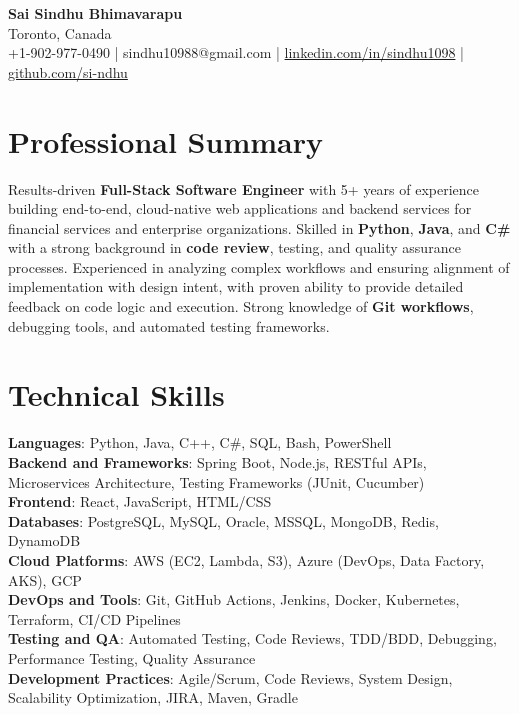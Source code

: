 \documentclass[letterpaper,11pt]{article}
\begin{document}
\begin{center}
  {\Large \textbf{Sai Sindhu Bhimavarapu}} \\
  Toronto, Canada \\
  +1-902-977-0490 \enspace | \enspace sindhu10988@gmail.com \enspace | \enspace \href{https://www.linkedin.com/in/sindhu1098/}{linkedin.com/in/sindhu1098} \enspace | \enspace \href{https://github.com/si-ndhu}{github.com/si-ndhu}
\end{center}

\section{Professional Summary}
  \begin{itemize}[leftmargin=0.15in, label={}]
    \small{\item{
     Results-driven \textbf{Full-Stack Software Engineer} with 5+ years of experience building end-to-end, cloud-native web applications and backend services for financial services and enterprise organizations. Skilled in \textbf{Python}, \textbf{Java}, and \textbf{C\#} with a strong background in \textbf{code review}, testing, and quality assurance processes. Experienced in analyzing complex workflows and ensuring alignment of implementation with design intent, with proven ability to provide detailed feedback on code logic and execution. Strong knowledge of \textbf{Git workflows}, debugging tools, and automated testing frameworks.
    }}
  \end{itemize}
\vspace{-16pt}

\section{Technical Skills}
 \begin{itemize}[leftmargin=0.15in, label={}]
    \small{\item{
     \textbf{Languages}: Python, Java, C++, C\#, SQL, Bash, PowerShell \\
     \textbf{Backend and Frameworks}: Spring Boot, Node.js, RESTful APIs, Microservices Architecture, Testing Frameworks (JUnit, Cucumber) \\
     \textbf{Frontend}: React, JavaScript, HTML/CSS \\
     \textbf{Databases}: PostgreSQL, MySQL, Oracle, MSSQL, MongoDB, Redis, DynamoDB \\
     \textbf{Cloud Platforms}: AWS (EC2, Lambda, S3), Azure (DevOps, Data Factory, AKS), GCP \\
     \textbf{DevOps and Tools}: Git, GitHub Actions, Jenkins, Docker, Kubernetes, Terraform, CI/CD Pipelines \\
     \textbf{Testing and QA}: Automated Testing, Code Reviews, TDD/BDD, Debugging, Performance Testing, Quality Assurance \\
     \textbf{Development Practices}: Agile/Scrum, Code Reviews, System Design, Scalability Optimization, JIRA, Maven, Gradle
    }}
 \end{itemize}
\vspace{-16pt}
\end{document}

